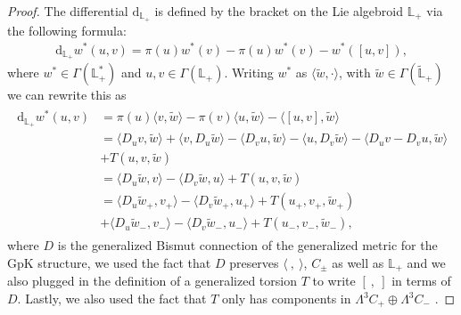 \documentclass{article}
\newcommand{\rd}{\mathrm{d}}
\newcommand{\Lb}{\mathbb{L}}
\newcommand{\se}{\Gamma}
\newcommand{\la}{\langle}
\newcommand{\ra}{\rangle}
\newcommand{\lara}{\la\ ,\ \ra}
\newcommand{\brac}{[\ ,\ ]}
\def\tl{\tilde}
\theoremstyle{definition}
\theoremstyle{definition}
\theoremstyle{remark}
\begin{document}
\begin{proof}
The differential $\rd_{\Lb_+}$ is defined by the bracket on the Lie algebroid $\Lb_+$ via the following formula:
\begin{align}\label{eq:proof_Liethm}
\rd_{\Lb_+}  w^* (u,v)=\pi(u) w^*(v)-\pi(u) w^*(v)- w^*([u,v]),
\end{align}
where $ w^* \in \se(\Lb_+^*)$ and $u,v\in \se(\Lb_+)$. Writing $ w^*$ as $\la \tl{w},\cdot\ra$, with $\tl{w}\in\se (\tl{\Lb}_+)$ we can rewrite this as
\begin{align}\label{dL}
\begin{aligned}
\rd_{\Lb_+}  w^* (u,v)&=\pi(u)\la v ,\tl{w}\ra-\pi(v)\la u,\tl{w}\ra-\la [u,v],\tl{w}\ra\\
&=\la D_uv,\tl{w}\ra+\la v,D_u \tl{w}\ra-\la D_v u,\tl{w}\ra-\la u,D_v\tl{w}\ra-\la D_uv-D_vu,\tl{w}\ra\\
&+{T}(u,v,\tl{w})\\
&=\la D_u \tl{w},v\ra-\la D_v\tl{w},u\ra+{T}(u,v,\tl{w})\\
&=\la D_u \tl{w}_+,v_+\ra-\la D_v\tl{w}_+,u_+\ra+{T}(u_+,v_+,\tl{w}_+)\\
&+\la D_u \tl{w}_-,v_-\ra-\la D_v\tl{w}_-,u_-\ra+{T}(u_-,v_-,\tl{w}_-),
\end{aligned}
\end{align}
where $D$ is the generalized Bismut connection of the generalized metric for the GpK structure, we used the fact that $D$ preserves $\lara$, $C_\pm$ as well as $\Lb_+$ and we also plugged in the definition of a generalized torsion ${T}$ \cite[Def.~3]{Gualtieri:2010fd} to write $\brac$ in terms of $D$. Lastly, we also used the fact that $T$ only has components in $\Lambda^3 C_+\oplus\Lambda^3 C_-$ \cite{Gualtieri:2010fd}.


\end{proof}
\end{document}
